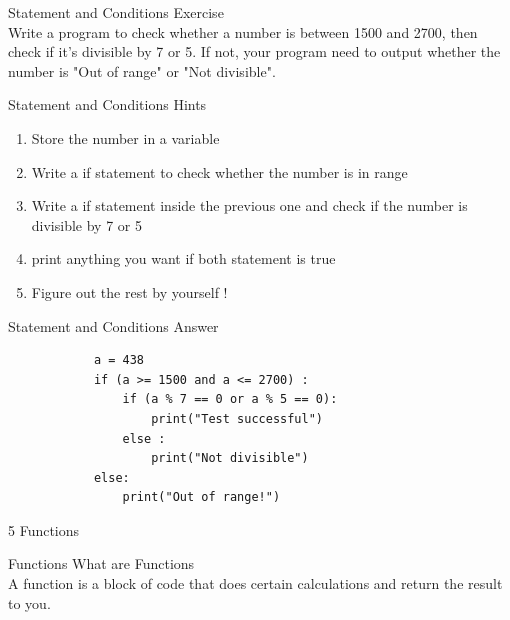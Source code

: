 \documentclass{beamer}
\begin{document}
    
    \begin{frame}{Statement and Conditions}
        \color{blue} \Large Exercise \\
        \color{black} \normalsize \vskip 5pt
        Write a program to check whether a number is between 1500 and 2700, then check 
        if it's divisible by 7 or 5. If not, your program need to output whether the 
        number is "Out of range" or "Not divisible".
    \end{frame}
    
    \begin{frame}{Statement and Conditions}
        \color{blue} \Large Hints \\
        \color{black} \normalsize \vskip 5pt
        \begin{enumerate}
            \item Store the number in a variable
            \item Write a if statement to check whether the number is in range
            \item Write a if statement inside the previous one and check if the number is divisible by 7 or 5
            \item print anything you want if both statement is true
            \item Figure out the rest by yourself !
        \end{enumerate}
    \end{frame}

    \begin{frame} [fragile] {Statement and Conditions}
        \color{blue} \Large Answer \\
        \color{black} \normalsize \vskip 10pt
        \begin{verbatim}
            a = 438
            if (a >= 1500 and a <= 2700) :
                if (a % 7 == 0 or a % 5 == 0):
                    print("Test successful")
                else :
                    print("Not divisible")
            else:
                print("Out of range!")
        \end{verbatim}
    \end{frame}

    \begin{frame}[plain, c]
        \begin{center}
            \color{blue} \LARGE 5 Functions
        \end{center}
    \end{frame}
    
    \begin{frame}{Functions}
        \color{blue} \Large What are Functions \\
        \color{black} \normalsize \vskip 5pt
        A function is a block of code that does certain calculations and return the result to you.\\
    \end{frame}
    
\end{document}
